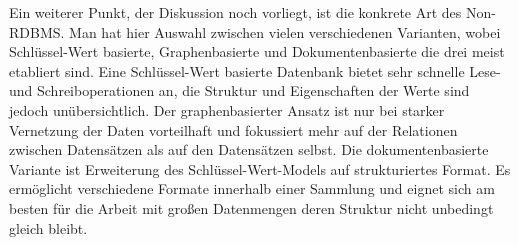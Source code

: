 Ein weiterer Punkt, der Diskussion noch vorliegt, ist die konkrete Art des Non-RDBMS. Man hat hier Auswahl zwischen vielen verschiedenen Varianten, wobei Schlüssel-Wert basierte, Graphenbasierte und Dokumentenbasierte die drei meist etabliert sind. Eine Schlüssel-Wert basierte Datenbank bietet sehr schnelle Lese- und Schreiboperationen an, die Struktur und Eigenschaften der Werte sind jedoch unübersichtlich. Der graphenbasierter Ansatz ist nur bei starker Vernetzung der Daten vorteilhaft und fokussiert mehr auf der Relationen zwischen Datensätzen als auf den Datensätzen selbst. Die dokumentenbasierte Variante ist Erweiterung des Schlüssel-Wert-Models auf strukturiertes Format. Es ermöglicht verschiedene Formate innerhalb einer Sammlung und eignet sich am besten für die Arbeit mit großen Datenmengen deren Struktur nicht unbedingt gleich bleibt.